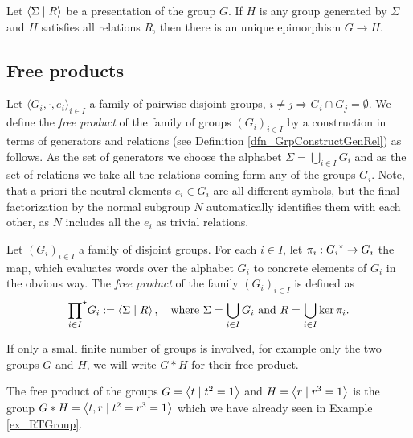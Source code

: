 \begin{theorem}
Let $\left\langle \Sigma \mid R \right\rangle$ be a presentation of the group $G$. If $H$ is any group generated by $\Sigma$ and $H$ satisfies all relations $R$, then there is an unique epimorphism $G \to H$.
\end{theorem}

\subsection{Free products}

Let $\langle G_i, \cdot, e_i \rangle_{i \in I}$ a family of pairwise disjoint groups, \ie $i \ne j \Rightarrow G_i \cap G_j = \emptyset$. We define the \emph{free product} of the family of groups $(G_i)_{i \in I}$ by a construction in terms of generators and relations (see Definition \ref{dfn_GrpConstructGenRel}) as follows. As the set of generators we choose the alphabet $\Sigma = \bigcup_{i \in I} G_i$ and as the set of relations we take all the relations coming form any of the groups $G_i$. Note, that a priori the neutral elements $e_i \in G_i$ are all different symbols, but the final factorization by the normal subgroup $N$ automatically identifies them with each other, as $N$ includes all the $e_i$ as trivial relations.

\begin{definition}
Let $(G_i)_{i \in I}$ a family of disjoint groups. For each $i \in I$, let $\pi_i : {G_i}^{\star} \to G_i$ the map, which evaluates words over the alphabet $G_i$ to concrete elements of $G_i$ in the obvious way. The \emph{free product} of the family $(G_i)_{i \in I}$ is defined as
\begin{equation*}
{\prod_{i \in I}}^{\star} G_i := \left\langle \Sigma \mid R \right\rangle, 
\quad \text{where } \Sigma = \bigcup_{i \in I} G_i \text{ and } R = \bigcup_{i \in I} \ker \pi_i.
\end{equation*} 
\end{definition}

If only a small finite number of groups is involved, for example only the two groups $G$ and $H$, we will write $G \ast H$ for their free product.

\begin{example}
The free product of the groups $G = \left\langle t \mid t^2 = 1 \right\rangle$ and $H = \left\langle r \mid r^3 = 1 \right\rangle$ is the group $G \ast H = \left\langle t,r \mid t^2 = r^3 = 1 \right\rangle$ which we have already seen in Example \ref{ex_RTGroup}.
\end{example}

